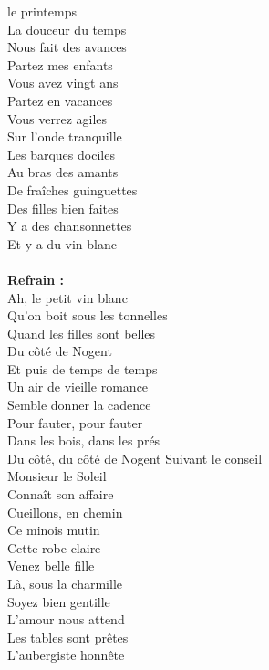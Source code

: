 
 le printemps
\\La douceur du temps
\\Nous fait des avances
\\Partez mes enfants
\\Vous avez vingt ans
\\Partez en vacances
\\Vous verrez agiles
\\Sur l'onde tranquille
\\Les barques dociles
\\Au bras des amants
\\De fraîches guinguettes
\\Des filles bien faites
\\Y a des chansonnettes
\\Et y a du vin blanc
\\\\\textbf{Refrain :}
\\Ah, le petit vin blanc
\\Qu'on boit sous les tonnelles
\\Quand les filles sont belles
\\Du côté de Nogent
\\Et puis de temps de temps
\\Un air de vieille romance
\\Semble donner la cadence
\\Pour fauter, pour fauter
\\Dans les bois, dans les prés
\\Du côté, du côté de Nogent
\breakpage
Suivant le conseil
\\Monsieur le Soleil
\\Connaît son affaire
\\Cueillons, en chemin
\\Ce minois mutin
\\Cette robe claire
\\Venez belle fille
\\Là, sous la charmille
\\Soyez bien gentille
\\L'amour nous attend
\\Les tables sont prêtes
\\L'aubergiste honnête
